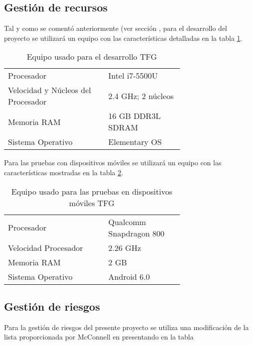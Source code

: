 	\subsection{Gestión de recursos}
	Tal y como se comentó anteriormente (ver sección %
	, para el desarrollo del proyecto se utilizará un equipo con las características detalladas en la tabla \ref{tab:portatil2}. 
	
	\begin{table}[H]
	  \centering 
	  \begin{tabular}{p{0.4\linewidth}p{0.3\linewidth}}
	    \toprule
		Procesador 							& Intel i7-5500U								\\
		Velocidad y Núcleos del Procesador & 2.4 GHz; 2 núcleos 							\\
		Memoria RAM 						& 16 \ac{GB} \ac{DDR}3L \ac{SDRAM} 			\\
		Sistema Operativo					& Elementary \ac{OS} 							\\
	    \hline
	  \end{tabular}
	  \caption{Equipo usado para el desarrollo \ac{TFG}}
	  \label{tab:portatil2}
	\end{table}
	
	Para las pruebas con dispositivos móviles se utilizará un equipo con las características mostradas en la tabla \ref{tab:movil2}.
	\begin{table}[H]
	  \centering 
	  \begin{tabular}{p{0.4\linewidth}p{0.3\linewidth}}
	    \toprule
		Procesador 	& Qualcomm Snapdragon 800		\\
		Velocidad Procesador 	& 2.26 GHz 			\\
		Memoria RAM 			& 2 \ac{GB} 		\\
		Sistema Operativo 		& Android 6.0 		\\
	    \hline
	  \end{tabular}
	  \caption{Equipo usado para las pruebas en dispositivos móviles \ac{TFG}}
	  \label{tab:movil2}
	\end{table}
	
	\subsection{Gestión de riesgos}
	Para la gestión de riesgos del presente proyecto se utiliza una modificación de la lista proporcionada por McConnell en \cite{Mcc97} presentando en la tabla 
	
